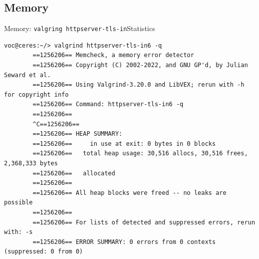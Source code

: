﻿\subsection{Memory}

\begin{frame}[fragile]{Memory: \texttt{valgring httpserver-tls-in}}{Statistics}
\begin{center}
    \begin{BVerbatim}[gobble=8, fontsize=\small]
        voc@ceres:~/> valgrind httpserver-tls-in6 -q
        ==1256206== Memcheck, a memory error detector
        ==1256206== Copyright (C) 2002-2022, and GNU GP'd, by Julian Seward et al.
        ==1256206== Using Valgrind-3.20.0 and LibVEX; rerun with -h for copyright info
        ==1256206== Command: httpserver-tls-in6 -q
        ==1256206==
        ^C==1256206==
        ==1256206== HEAP SUMMARY:
        ==1256206==     in use at exit: 0 bytes in 0 blocks
        ==1256206==   total heap usage: 30,516 allocs, 30,516 frees, 2,368,333 bytes
        ==1256206==   allocated
        ==1256206==
        ==1256206== All heap blocks were freed -- no leaks are possible
        ==1256206==
        ==1256206== For lists of detected and suppressed errors, rerun with: -s
        ==1256206== ERROR SUMMARY: 0 errors from 0 contexts (suppressed: 0 from 0)
    \end{BVerbatim}
\end{center}
\end{frame}

